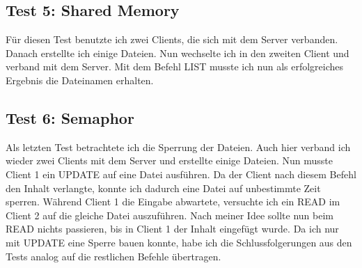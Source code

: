 \documentclass[12pt,a4paper,ngerman]{report}
\begin{document}
\subsection{Test 5: Shared Memory}
Für diesen Test benutzte ich zwei Clients, die sich mit dem Server verbanden. Danach erstellte ich einige Dateien. Nun wechselte ich in den zweiten Client und verband mit dem Server. Mit dem Befehl LIST musste ich nun als erfolgreiches Ergebnis die Dateinamen erhalten. 
\subsection{Test 6: Semaphor}
Als letzten Test betrachtete ich die Sperrung der Dateien. Auch hier verband ich wieder zwei Clients mit dem Server und erstellte einige Dateien. Nun musste Client 1 ein UPDATE auf eine Datei ausführen. Da der Client nach diesem Befehl den Inhalt verlangte, konnte ich dadurch eine Datei auf unbestimmte Zeit sperren. Während Client 1 die Eingabe abwartete, versuchte ich ein READ im Client 2 auf die gleiche Datei auszuführen. Nach meiner Idee sollte nun beim READ nichts passieren, bis in Client 1 der Inhalt eingefügt wurde. Da ich nur mit UPDATE eine Sperre bauen konnte, habe ich die Schlussfolgerungen aus den Tests analog auf die restlichen Befehle übertragen.
\end{document}
